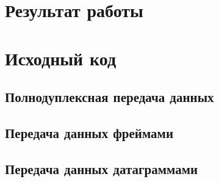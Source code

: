 \documentclass[a4paper,10pt]{article}
\begin{document}
\section{Результат работы}

\pagebreak

\appendix
\section{Исходный код}
\label{appendix:sources}


\subsection{Полнодуплексная передача данных}
\label{appendix:sources:duplex-link}

\subsection{Передача данных фреймами}
\label{appendix:sources:frame}

\subsection{Передача данных датаграммами}
\label{appendix:sources:datagram}

\pagebreak



\end{document}
